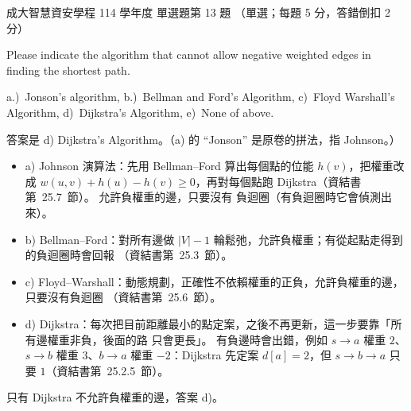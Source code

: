 \begin{pastexam}[label={px:ncku-114-isec-ds-13}]{成大智慧資安學程 114 學年度 單選題第 13 題}
（單選；每題 5 分，答錯倒扣 2 分）

Please indicate the algorithm that cannot allow negative weighted edges in finding the shortest path.

a.)~Jonson's algorithm, \qquad b.)~Bellman and Ford's Algorithm, \qquad c)~Floyd Warshall's Algorithm,
\qquad d)~Dijkstra's Algorithm, \qquad e)~None of above.
\end{pastexam}

\begin{pastsoln}
答案是 d) Dijkstra's Algorithm。（a) 的 ``Jonson'' 是原卷的拼法，指 Johnson。）

\begin{itemize}
\item a) Johnson 演算法：先用 Bellman--Ford 算出每個點的位能 $h(v)$，把權重改成
$w(u, v) + h(u) - h(v) \ge 0$，再對每個點跑 Dijkstra（資結書第~25.7~節）。 允許負權重的邊，只要沒有
負迴圈（有負迴圈時它會偵測出來）。
\item b) Bellman--Ford：對所有邊做 $|V| - 1$ 輪鬆弛，允許負權重；有從起點走得到的負迴圈時會回報
（資結書第~25.3~節）。
\item c) Floyd--Warshall：動態規劃，正確性不依賴權重的正負，允許負權重的邊，只要沒有負迴圈
（資結書第~25.6~節）。
\item d) Dijkstra：每次把目前距離最小的點定案，之後不再更新，這一步要靠「所有邊權重非負，後面的路
只會更長」。 有負邊時會出錯，例如 $s \to a$ 權重 $2$、$s \to b$ 權重 $3$、$b \to a$ 權重 $-2$：Dijkstra 先定案
$d[a] = 2$，但 $s \to b \to a$ 只要 $1$（資結書第~25.2.5~節）。
\end{itemize}
只有 Dijkstra 不允許負權重的邊，答案 d)。
\end{pastsoln}

